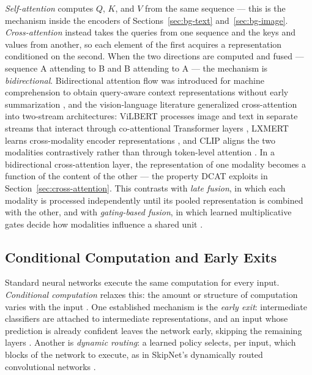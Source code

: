 \documentclass[10pt,twoside]{article}
\begin{document}
\emph{Self-attention} computes $Q$, $K$, and $V$ from the same sequence --- this is the mechanism inside the encoders of Sections~\ref{sec:bg-text} and~\ref{sec:bg-image}. \emph{Cross-attention} instead takes the queries from one sequence and the keys and values from another, so each element of the first acquires a representation conditioned on the second. When the two directions are computed and fused --- sequence A attending to B and B attending to A --- the mechanism is \emph{bidirectional}. Bidirectional attention flow was introduced for machine comprehension to obtain query-aware context representations without early summarization \citep{seo2017bidaf}, and the vision-language literature generalized cross-attention into two-stream architectures: ViLBERT processes image and text in separate streams that interact through co-attentional Transformer layers \citep{lu2019vilbert}, LXMERT learns cross-modality encoder representations \citep{tan2019lxmert}, and CLIP aligns the two modalities contrastively rather than through token-level attention \citep{radford2021clip}. In a bidirectional cross-attention layer, the representation of one modality becomes a function of the content of the other --- the property DCAT exploits in Section~\ref{sec:cross-attention}. This contrasts with \emph{late fusion}, in which each modality is processed independently until its pooled representation is combined with the other, and with \emph{gating-based fusion}, in which learned multiplicative gates decide how modalities influence a shared unit \citep{arevalo2017gmu}.

\subsection{Conditional Computation and Early Exits}\label{sec:bg-conditional}

Standard neural networks execute the same computation for every input. \emph{Conditional computation} relaxes this: the amount or structure of computation varies with the input \citep{han2022dynamicsurvey}. One established mechanism is the \emph{early exit}: intermediate classifiers are attached to intermediate representations, and an input whose prediction is already confident leaves the network early, skipping the remaining layers \citep{teerapittayanon2016branchynet}. Another is \emph{dynamic routing}: a learned policy selects, per input, which blocks of the network to execute, as in SkipNet's dynamically routed convolutional networks \citep{wang2018skipnet}.
\end{document}
